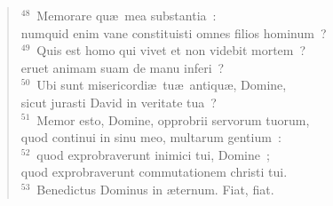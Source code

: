 \begin{verse}
${}^{48}$~Memorare qu\ae\ mea substantia~:\\ numquid enim vane constituisti omnes filios hominum~?\\
${}^{49}$~Quis est homo qui vivet et non videbit mortem~?\\ eruet animam suam de manu inferi~?\\
${}^{50}$~Ubi sunt misericordi\ae\ tu\ae\ antiqu\ae , Domine,\\ sicut jurasti David in veritate tua~?\\
${}^{51}$~Memor esto, Domine, opprobrii servorum tuorum,\\ quod continui in sinu meo, multarum gentium~:\\
${}^{52}$~quod exprobraverunt inimici tui, Domine~;\\ quod exprobraverunt commutationem christi tui.\\
${}^{53}$~Benedictus Dominus in \ae ternum. Fiat, fiat.\end{verse}



